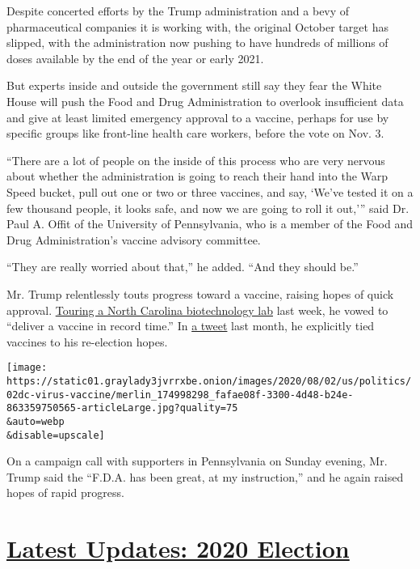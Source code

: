 Despite concerted efforts by the Trump administration and a bevy of
pharmaceutical companies it is working with, the original October target
has slipped, with the administration now pushing to have hundreds of
millions of doses available by the end of the year or early 2021.

But experts inside and outside the government still say they fear the
White House will push the Food and Drug Administration to overlook
insufficient data and give at least limited emergency approval to a
vaccine, perhaps for use by specific groups like front-line health care
workers, before the vote on Nov. 3.

``There are a lot of people on the inside of this process who are very
nervous about whether the administration is going to reach their hand
into the Warp Speed bucket, pull out one or two or three vaccines, and
say, `We've tested it on a few thousand people, it looks safe, and now
we are going to roll it out,''' said Dr. Paul A. Offit of the University
of Pennsylvania, who is a member of the Food and Drug Administration's
vaccine advisory committee.

``They are really worried about that,'' he added. ``And they should
be.''

Mr. Trump relentlessly touts progress toward a vaccine, raising hopes of
quick approval.
\href{https://www.nytimes3xbfgragh.onion/video/us/100000007258794/trump-boasts-vaccine-progress-north-carolina.html}{Touring
a North Carolina biotechnology lab} last week, he vowed to ``deliver a
vaccine in record time.'' In
\href{https://twitter.com/realdonaldtrump/status/1283566319405797378}{a
tweet} last month, he explicitly tied vaccines to his re-election hopes.

\texttt{[image: https://static01.graylady3jvrrxbe.onion/images/2020/08/02/us/politics/02dc-virus-vaccine/merlin\_174998298\_fafae08f-3300-4d48-b24e-863359750565-articleLarge.jpg?quality=75\\\&auto=webp\\\&disable=upscale]}

On a campaign call with supporters in Pennsylvania on Sunday evening,
Mr. Trump said the ``F.D.A. has been great, at my instruction,'' and he
again raised hopes of rapid progress.

\hypertarget{latest-updates-2020-election}{%
\section{\texorpdfstring{\href{https://www.nytimes3xbfgragh.onion/2020/07/31/us/elections/biden-vs-trump.html?action=click\&pgtype=Article\&state=default\&region=MAIN_CONTENT_1\&context=storylines_live_updates}{Latest
Updates: 2020
Election}}{Latest Updates: 2020 Election}}\label{latest-updates-2020-election}}

